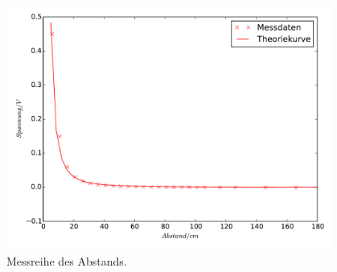 \begin{figure}
  \centering
  \includegraphics[height=8cm]{LED.pdf}
  \caption{Messreihe des Abstands.}
  \label{fig:LED}
\end{figure}
